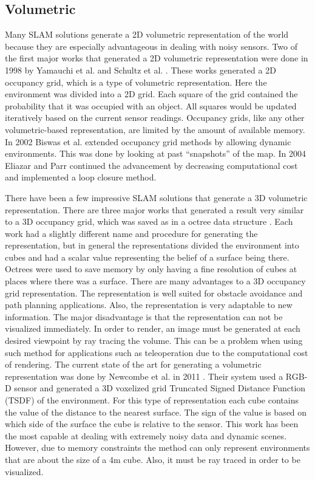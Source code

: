 \subsection{Volumetric}

Many SLAM solutions generate a 2D volumetric representation of the world
because they are especially advantageous in dealing with noisy sensors. Two
of the first major works that generated a 2D volumetric representation
were done in 1998 by Yamauchi et al. \cite{Yamauchi1998} and Schultz et al.
\cite{Schultz1998}. These works generated a 2D occupancy grid, which is a
type of volumetric representation. Here the environment was divided into a
2D grid. Each square of the grid contained the probability that it was
occupied with an object. All squares would be updated iteratively based on
the current sensor readings. Occupancy grids, like any other
volumetric-based representation, are limited by the amount of available
memory. In 2002 Biswas et al. \cite{Biswas2002} extended occupancy grid
methods by allowing dynamic environments. This was done by looking at past
``snapshots'' of the map. In 2004 Eliazar and Parr \cite{Eliazar2004}
continued the advancement by decreasing computational cost and implemented
a loop closure method.

There have been a few impressive SLAM solutions that generate a 3D volumetric
representation. There are three major works that generated a result very similar
to a 3D occupancy grid, which was saved as in a octree data structure
\cite{Magnusson2007,Nuchter2007,Huang2011,Endres2012}. Each work had a slightly
different name and procedure for generating the representation, but in general
the representations divided the environment into cubes and had a scalar value
representing the belief of a surface being there. Octrees were used to save
memory by only having a fine resolution of cubes at places where there was a
surface. There are many advantages to a 3D occupancy grid representation. The
representation is well suited for obstacle avoidance and path planning
applications. Also, the representation is very adaptable to new information. The
major disadvantage is that the representation can not be visualized immediately.
In order to render, an image must be generated at each desired viewpoint by ray
tracing the volume. This can be a problem when using such method for
applications such as teleoperation due to the computational cost of rendering.
The current state of the art for generating a volumetric representation was done
by Newcombe et al. in 2011 \cite{Newcombe2011a}. Their system used a RGB-D
sensor and generated a 3D voxelized grid Truncated Signed Distance Function
(TSDF) of the environment. For this type of representation each cube contains
the value of the distance to the nearest surface. The sign of the value is based
on which side of the surface the cube is relative to the sensor. This work has
been the most capable at dealing with extremely noisy data and dynamic scenes.
However, due to memory constraints the method can only represent environments
that are about the size of a 4m cube. Also, it must be ray traced in order to be
visualized.


